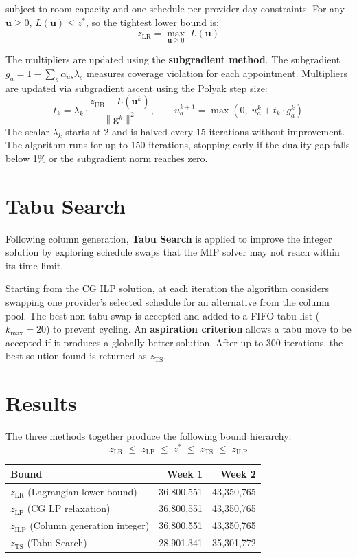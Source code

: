 \documentclass[12pt]{article}
\begin{document}
subject to room capacity and one-schedule-per-provider-day constraints. For any
$\mathbf{u} \geq 0$, $L(\mathbf{u}) \leq z^*$, so the tightest lower bound is:
\[
z_{\mathrm{LR}} = \max_{\mathbf{u} \geq 0} \; L(\mathbf{u})
\]

The multipliers are updated using the \textbf{subgradient method}. The subgradient
$g_a = 1 - \sum_s \alpha_{as}\lambda_s$ measures coverage violation for each appointment.
Multipliers are updated via subgradient ascent using the Polyak step size:
\[
t_k = \lambda_k \cdot \frac{z_{\mathrm{UB}} - L(\mathbf{u}^k)}{\|\mathbf{g}^k\|^2},
\qquad
u_a^{k+1} = \max\!\left(0,\; u_a^k + t_k \cdot g_a^k\right)
\]
The scalar $\lambda_k$ starts at 2 and is halved every 15 iterations without improvement.
The algorithm runs for up to 150 iterations, stopping early if the duality gap falls
below 1\% or the subgradient norm reaches zero.

\section{Tabu Search}

Following column generation, \textbf{Tabu Search} is applied to improve the integer
solution by exploring schedule swaps that the MIP solver may not reach within its time
limit.

Starting from the CG ILP solution, at each iteration the algorithm considers swapping one
provider's selected schedule for an alternative from the column pool. The best non-tabu
swap is accepted and added to a FIFO tabu list ($k_{\max} = 20$) to prevent cycling. An
\textbf{aspiration criterion} allows a tabu move to be accepted if it produces a globally
better solution. After up to 300 iterations, the best solution found is returned as
$z_{\mathrm{TS}}$.

\section{Results}

The three methods together produce the following bound hierarchy:
\[
z_{\mathrm{LR}} \;\leq\; z_{\mathrm{LP}} \;\leq\; z^* \;\leq\; z_{\mathrm{TS}} \;\leq\; z_{\mathrm{ILP}}
\]

\begin{center}
\begin{tabular}{lrr}
\toprule
\textbf{Bound} & \textbf{Week 1} & \textbf{Week 2} \\
\midrule
$z_{\mathrm{LR}}$ (Lagrangian lower bound)    & 36{,}800{,}551 & 43{,}350{,}765 \\
$z_{\mathrm{LP}}$ (CG LP relaxation)          & 36{,}800{,}551 & 43{,}350{,}765 \\
$z_{\mathrm{ILP}}$ (Column generation integer) & 36{,}800{,}551 & 43{,}350{,}765 \\
$z_{\mathrm{TS}}$ (Tabu Search)               & 28{,}901{,}341 & 35{,}301{,}772 \\
\bottomrule
\end{tabular}
\end{center}
\end{document}
